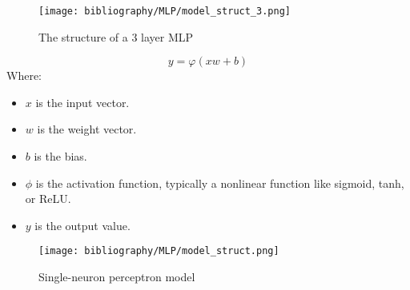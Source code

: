 \documentclass{ieeeojies}
\begin{document}
\begin{figure}[H]
    \centering
    \begin{minipage}{0.45\textwidth}
    \centering
    \texttt{[image: bibliography/MLP/model\_struct\_3.png]} 
    \label{fig:1}
    \caption{ The structure of a 3 layer MLP \cite{b16}}
    \end{minipage}
\end{figure}

\[
y = \varphi(xw + b)
\]
Where:
\begin{itemize}
    \item $x$ is the input vector.
    \item $w$ is the weight vector.
    \item $b$ is the bias.
    \item $\phi$ is the activation function, typically a nonlinear function like sigmoid, tanh, or ReLU.
    \item $y$ is the output value.
\end{itemize}

\begin{figure}[H]
    \centering
    \begin{minipage}{0.45\textwidth}
    \centering
    \texttt{[image: bibliography/MLP/model\_struct.png]} 
    \label{fig:1}
    \caption{Single-neuron perceptron model \cite{b15}}
    \end{minipage}
\end{figure}
\end{document}
